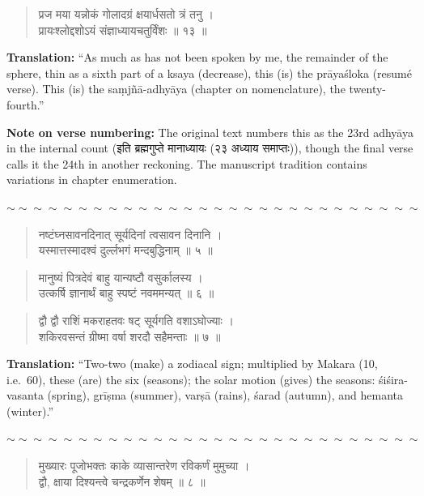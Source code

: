 \documentclass[11pt,a4paper]{article}
\newcommand{\dev}[1]{{\devanagarifont #1}}
\newenvironment{shloka}
  {\begin{verse}\devanagarifont\color{versecolor}}
  {\end{verse}}
\newenvironment{commentary}
  {\small\color{commentarycolor}\par\noindent\ignorespaces}
  {\par}
\newcommand{\wavydivider}{\begin{center}$\sim\sim\sim\sim\sim\sim\sim\sim\sim\sim\sim\sim\sim\sim\sim\sim\sim\sim\sim\sim\sim\sim\sim\sim\sim\sim\sim\sim$\end{center}}
\begin{document}
\begin{shloka}
\dev{प्रज मया यन्नोकं गोलादग्रं क्षयार्धसतो त्रं तनु ।}\\
\dev{प्रायःश्लोद्दशोऽयं संज्ञाध्यायचतुर्विंशः ॥ १३ ॥}
\end{shloka}

\textbf{Translation:} ``As much as has not been spoken by me, the remainder of the sphere, thin as a sixth part of a ksaya (decrease), this (is) the prāyaśloka (resumé verse). This (is) the saṃjñā-adhyāya (chapter on nomenclature), the twenty-fourth.''

\begin{commentary}
\textbf{Note on verse numbering:} The original text numbers this as the 23rd adhyāya in the internal count (\dev{इति ब्रह्मगुप्ते मानाध्यायः (२३ अध्याय समाप्तः)}), though the final verse calls it the 24th in another reckoning. The manuscript tradition contains variations in chapter enumeration.
\end{commentary}

\wavydivider

\begin{shloka}
\dev{नष्टंघ्नसावनदिनात् सूर्यदिनां त्वसावन दिनानि ।}\\
\dev{यस्मात्तस्मादश्वं दुर्ल्लभगं मन्दबुद्धिनाम् ॥ ५ ॥}
\end{shloka}

\begin{shloka}
\dev{मानुष्यं पित्रदेवं बाहु यान्यष्टौ वसुर्कालस्य ।}\\
\dev{उत्कर्षि ज्ञानार्थं बाहु स्पष्टं नवममन्यत् ॥ ६ ॥}
\end{shloka}

\begin{shloka}
\dev{द्वौ द्वौ राशिं मकराहतवः षट् सूर्यगति वशाऽघोज्याः ।}\\
\dev{शकिरवसन्तं ग्रीष्मा वर्षा शरदौ सहैमन्ताः ॥ ७ ॥}
\end{shloka}

\textbf{Translation:} ``Two-two (make) a zodiacal sign; multiplied by Makara (10, i.e.\ 60), these (are) the six (seasons); the solar motion (gives) the seasons: śiśira-vasanta (spring), grīṣma (summer), varṣā (rains), śarad (autumn), and hemanta (winter).''

\wavydivider

\begin{shloka}
\dev{मुख्यारः पूजोभक्तः काके व्यासान्तरेण रविकर्णं मुमुच्या ।}\\
\dev{द्वौ, क्षाया दिश्यन्त्वे चन्द्रकर्णेन शेषम् ॥ ८ ॥}
\end{shloka}
\end{document}
